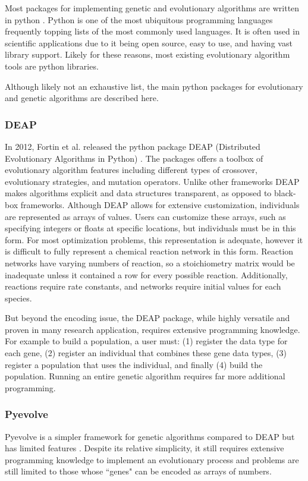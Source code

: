 \documentclass[12pt]{report}
\begin{document}
Most packages for implementing genetic and evolutionary algorithms are written in python \cite{python3}. Python is one of the most ubiquitous programming languages frequently topping lists of the most commonly used languages. It is often used in scientific applications due to it being open source, easy to use, and having vast library support. Likely for these reasons, most existing evolutionary algorithm tools are python libraries.

Although likely not an exhaustive list, the main python packages for evolutionary and genetic algorithms are described here.


\subsubsection{DEAP}
In 2012, Fortin et al. released the python package DEAP (Distributed Evolutionary Algorithms in Python) \cite{DEAP_JMLR2012}. The packages offers a toolbox of evolutionary algorithm features including different types of crossover, evolutionary strategies, and mutation operators. Unlike other frameworks DEAP makes algorithms explicit and data structures transparent, as opposed to black-box frameworks. Although DEAP allows for extensive customization, individuals are represented as arrays of values. Users can customize these arrays, such as specifying integers or floats at specific locations, but individuals must be in this form. For most optimization problems, this representation is adequate, however it is difficult to fully represent a chemical reaction network in this form. Reaction networks have varying numbers of reaction, so a stoichiometry matrix would be inadequate unless it contained a row for every possible reaction. Additionally, reactions require rate constants, and networks require initial values for each species. 

But beyond the encoding issue, the DEAP package, while highly versatile and proven in many research application, requires extensive programming knowledge. For example to build a population, a user must: (1) register the data type for each gene, (2) register an individual that combines these gene data types, (3) register a population that uses the individual, and finally (4) build the population. Running an entire genetic algorithm requires far more additional programming. 

\subsubsection{Pyevolve}
Pyevolve is a simpler framework for genetic algorithms compared to DEAP but has limited features \cite{pyevolve}. Despite its relative simplicity, it still requires extensive programming knowledge to implement an evolutionary process and problems are still limited to those whose ``genes" can be encoded as arrays of numbers. 
\end{document}
